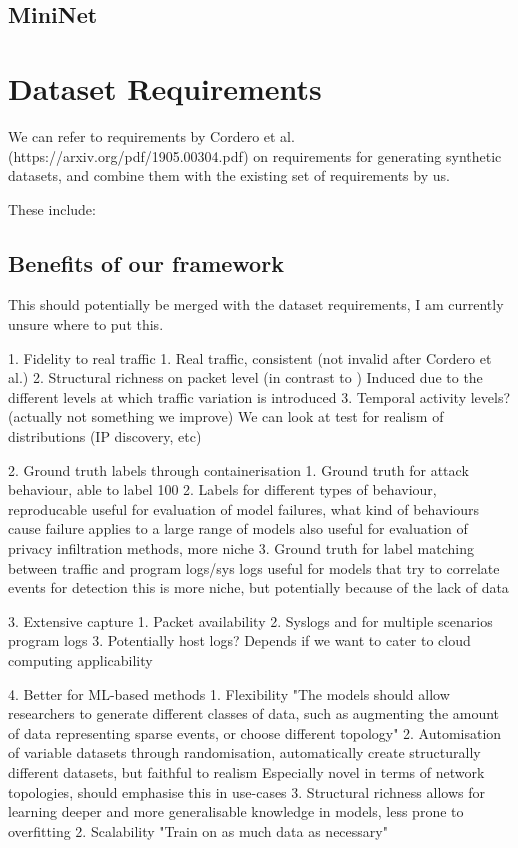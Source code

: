 \documentclass[sigconf]{acmart}
\begin{document}
\subsection{MiniNet}



\section{Dataset Requirements}\label{Sec:require}



We can refer to requirements by Cordero et al. (https://arxiv.org/pdf/1905.00304.pdf) on requirements for generating synthetic datasets, and combine them with the existing set of requirements by us. 

These include:




\subsection{Benefits of our framework}

This should potentially be merged with the dataset requirements, I am currently unsure where to put this. 

1. Fidelity to real traffic
	1. Real traffic, consistent (not invalid after Cordero et al.)
	2. Structural richness on packet level (in contrast to )
		Induced due to the different levels at which traffic variation is introduced
	3. Temporal activity levels? (actually not something we improve)
			We can look at test for realism of distributions (IP discovery, etc)

2. Ground truth labels through containerisation
	1. Ground truth for attack behaviour, able to label 100%
	2. Labels for different types of behaviour, reproducable
		useful for evaluation of model failures, what kind of behaviours cause failure
			applies to a large range of models
		also useful for evaluation of privacy infiltration methods, more niche
	3. Ground truth for label matching between traffic and program logs/sys logs
		useful for models that try to correlate events for detection
			this is more niche, but potentially because of the lack of data

3. Extensive capture
	1. Packet availability
	2. Syslogs and for multiple scenarios program logs
	3. Potentially host logs? Depends if we want to cater to cloud computing applicability


4. Better for ML-based methods
	1. Flexibility 
		"The models should allow researchers to generate different classes of data, such as augmenting the amount of data representing sparse events, or choose different topology"
	2. Automisation of variable datasets through randomisation, automatically create structurally different datasets, but faithful to realism
		Especially novel in terms of network topologies, should emphasise this in use-cases
	3. Structural richness 
			allows for learning deeper and more generalisable knowledge in models, less prone to overfitting
	2. Scalability
		"Train on as much data as necessary"
\end{document}
